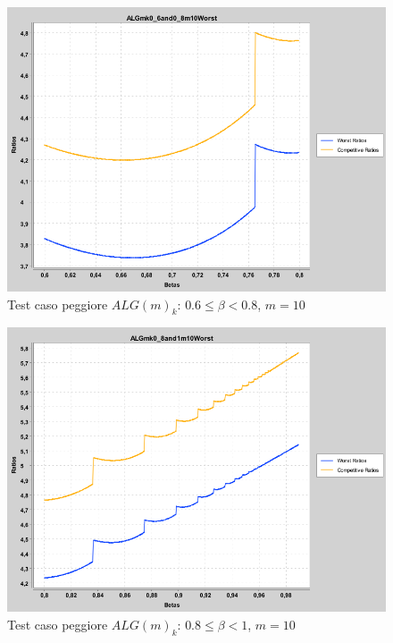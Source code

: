 \documentclass[12pt]{article}
\begin{document}
\begin{figure}[H]
\caption{Test caso peggiore $ALG(m)_{k}$: $0.6 \leq \beta < 0.8$, $m = 10$}
\centering
\includegraphics[scale=0.4]{worst/ALGmk0_6and0_8m10Worst.png}
\end{figure}
\begin{figure}[H]
\caption{Test caso peggiore $ALG(m)_{k}$: $0.8 \leq \beta < 1$, $m = 10$}
\centering
\includegraphics[scale=0.4]{worst/ALGmk0_8and1m10Worst.png}
\end{figure}
\end{document}
